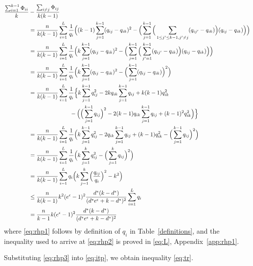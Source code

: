 \documentclass[11pt,onecolumn]{IEEEtran}
\def\mathbi#1{{\textbf{\textit #1}}}
\DeclareMathOperator{\tr}{tr}
\begin{document}
  \begin{align}
  \frac{\sum_{i=1}^{k-1}\Phi_{ii}}{k}&-\frac{\sum_{i\neq j}\Phi_{ij} }{k(k-1)} \nonumber\\
& = \frac{n}{k(k-1)} \sum_{i=1}^L \frac{1}{q_i} 
\Big( (k-1)  \sum_{j=1}^{k-1} (q_{ij}-q_{ik})^2  - 
\Big(\sum_{j=1}^{k-1} \Big(\sum_{1\le j'\le k-1, j'\neq j} (q_{ij'}-q_{ik}) \Big) (q_{ij}-q_{ik}) \Big)  \Big)\nonumber \\
  & = \frac{n}{k(k-1)} \sum_{i=1}^L \frac{1}{q_i} 
\Big(  k  \sum_{j=1}^{k-1} (q_{ij}-q_{ik})^2  - 
\Big(\sum_{j=1}^{k-1} \Big(\sum_{j'=1}^{k-1} (q_{ij'}-q_{ik}) \Big) (q_{ij}-q_{ik}) \Big)  \Big)\nonumber \\
& = \frac{n}{k(k-1)} \sum_{i=1}^L \frac{1}{q_i} 
\Big(  k  \sum_{j=1}^{k-1} (q_{ij}-q_{ik})^2  - 
\Big(\sum_{j=1}^{k-1}  (q_{ij}-q_{ik}) \Big)^2  \Big) \nonumber\\
& = \frac{n}{k(k-1)} \sum_{i=1}^L \frac{1}{q_i} 
\Big\{  k  \sum_{j=1}^{k-1} q_{ij}^2 - 2kq_{ik} \sum_{j=1}^{k-1} q_{ij} 
+ k(k-1) q_{ik}^2  \nonumber \\
 & \hspace*{1in}   - \Big( \Big( \sum_{j=1}^{k-1} q_{ij} \Big)^2 
-2(k-1) q_{ik} \sum_{j=1}^{k-1} q_{ij} + (k-1)^2 q_{ik}^2 \Big) \Big\} \nonumber\\
& =   \frac{n}{k(k-1)} \sum_{i=1}^L \frac{1}{q_i} 
\Big(  k  \sum_{j=1}^{k-1} q_{ij}^2 - 2q_{ik} \sum_{j=1}^{k-1} q_{ij} 
+ (k-1) q_{ik}^2 
 -  \Big( \sum_{j=1}^{k-1} q_{ij} \Big)^2  \Big)\nonumber \\
& =  \frac{n}{k(k-1)} \sum_{i=1}^L \frac{1}{q_i} 
\Big(  k  \sum_{j=1}^{k} q_{ij}^2 
 -  \Big( \sum_{j=1}^{k} q_{ij} \Big)^2  \Big) \nonumber\\
& = \frac{n}{k(k-1)} \sum_{i=1}^L  q_i 
\Big(  k  \sum_{j=1}^{k} \Big( \frac{q_{ij}}{q_i} \Big)^2 
 -  k^2  \Big)  \label{eq:rhp1}\\
& \le \frac{n}{k(k-1)} k^2 (e^{\epsilon} - 1)^2  
 \frac{d^\ast (k-d^\ast)} {(d^\ast e^{\epsilon} + k - d^\ast)^2}
 \sum_{i=1}^L  q_i \label{eq:rhp2} \\
& = \frac{n}{k-1} k (e^{\epsilon} - 1)^2  
 \frac{d^\ast (k-d^\ast)} {(d^\ast e^{\epsilon} + k - d^\ast)^2} \label{eq:rhp3}
 \end{align}
  where \eqref{eq:rhp1} follows by definition of $q_i$ in Table~\ref{definitions}, and the inequality used to arrive at
\eqref{eq:rhp2} is proved in \eqref{eq:L}, Appendix~\ref{app:rhp1}.

Substituting \eqref{eq:rhp3} into \eqref{eq:itp}, we obtain inequality \eqref{eq:tr}.
\end{document}
